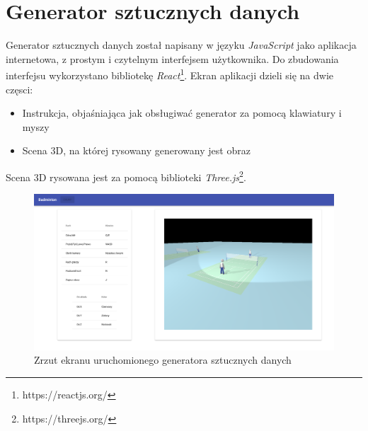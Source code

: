 \newpage
\section{Generator sztucznych danych}

Generator sztucznych danych został napisany w języku \textit{JavaScript} jako aplikacja internetowa, z prostym i czytelnym interfejsem użytkownika.
Do zbudowania interfejsu wykorzystano bibliotekę \textit{React}\footnote{https://reactjs.org/}.
Ekran aplikacji dzieli się na dwie częsci:
\begin{itemize}
  \item Instrukcja, objaśniająca jak obsługiwać generator za pomocą klawiatury i myszy
  \item Scena 3D, na której rysowany generowany jest obraz
\end{itemize}
Scena 3D rysowana jest za pomocą biblioteki \textit{Three.js}\footnote{https://threejs.org/}.

\begin{figure}[!htb]
  \includegraphics[width=\linewidth]{./generator_1.png}
    \caption{Zrzut ekranu uruchomionego generatora sztucznych danych}
\end{figure}
